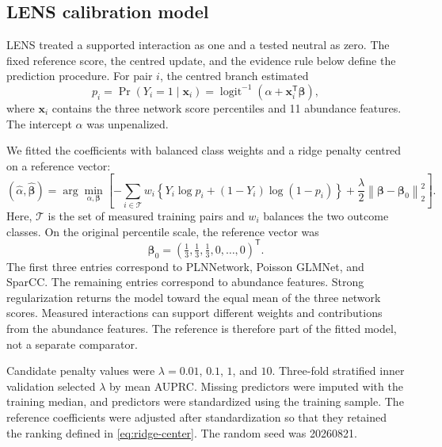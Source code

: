 \documentclass[11pt]{article}
\begin{document}
\subsection{LENS calibration model}

LENS treated a supported interaction as one and a tested neutral as zero.
The fixed reference score, the centred update, and the evidence rule below define the prediction procedure.
For pair $i$, the centred branch estimated
\begin{equation}
p_i = \Pr(Y_i=1\mid\mathbf{x}_i)
    = \operatorname{logit}^{-1}\!\left(\alpha+\mathbf{x}_i^{\mathsf T}\boldsymbol\beta\right),
\label{eq:calibration-probability}
\end{equation}
where $\mathbf{x}_i$ contains the three network score percentiles and 11 abundance features.
The intercept $\alpha$ was unpenalized.

We fitted the coefficients with balanced class weights and a ridge penalty centred on a reference vector:
\begin{equation}
(\widehat\alpha,\widehat{\boldsymbol\beta})
= \arg\min_{\alpha,\boldsymbol\beta}
\left[
-\sum_{i\in\mathcal{T}} w_i
\left\{Y_i\log p_i+(1-Y_i)\log(1-p_i)\right\}
+\frac{\lambda}{2}\left\|\boldsymbol\beta-\boldsymbol\beta_{0}\right\|_2^2
\right].
\label{eq:centered-ridge}
\end{equation}
Here, $\mathcal{T}$ is the set of measured training pairs and $w_i$ balances the two outcome classes.
On the original percentile scale, the reference vector was
\begin{equation}
\boldsymbol\beta_{0}
= \left(\tfrac{1}{3},\tfrac{1}{3},\tfrac{1}{3},0,\ldots,0\right)^{\mathsf T}.
\label{eq:ridge-center}
\end{equation}
The first three entries correspond to PLNNetwork, Poisson GLMNet, and SparCC.
The remaining entries correspond to abundance features.
Strong regularization returns the model toward the equal mean of the three network scores.
Measured interactions can support different weights and contributions from the abundance features.
The reference is therefore part of the fitted model, not a separate comparator.

Candidate penalty values were $\lambda=0.01$, $0.1$, $1$, and $10$.
Three-fold stratified inner validation selected $\lambda$ by mean AUPRC.
Missing predictors were imputed with the training median, and predictors were standardized using the training sample.
The reference coefficients were adjusted after standardization so that they retained the ranking defined in \cref{eq:ridge-center}.
The random seed was 20260821.
\end{document}
